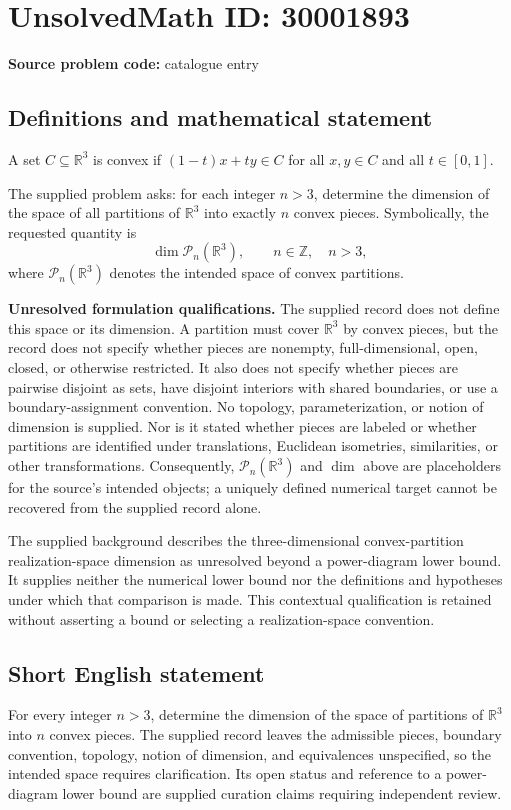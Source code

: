 \documentclass[11pt]{article}
\newcommand{\Z}{\mathbb{Z}}
\newcommand{\R}{\mathbb{R}}
\begin{document}
\section*{UnsolvedMath ID: 30001893}
\textbf{Source problem code:} catalogue entry
\subsection{Definitions and mathematical statement}
A set \(C\subseteq\R^3\) is convex if \((1-t)x+ty\in C\) for all \(x,y\in C\) and all \(t\in[0,1]\).

The supplied problem asks: for each integer \(n>3\), determine the dimension of the space of all partitions of \(\R^3\) into exactly \(n\) convex pieces. Symbolically, the requested quantity is
\[
\dim\mathcal P_n(\R^3),\qquad n\in\Z,\quad n>3,
\]
where \(\mathcal P_n(\R^3)\) denotes the intended space of convex partitions.

\textbf{Unresolved formulation qualifications.} The supplied record does not define this space or its dimension. A partition must cover \(\R^3\) by convex pieces, but the record does not specify whether pieces are nonempty, full-dimensional, open, closed, or otherwise restricted. It also does not specify whether pieces are pairwise disjoint as sets, have disjoint interiors with shared boundaries, or use a boundary-assignment convention. No topology, parameterization, or notion of dimension is supplied. Nor is it stated whether pieces are labeled or whether partitions are identified under translations, Euclidean isometries, similarities, or other transformations. Consequently, \(\mathcal P_n(\R^3)\) and \(\dim\) above are placeholders for the source's intended objects; a uniquely defined numerical target cannot be recovered from the supplied record alone.

The supplied background describes the three-dimensional convex-partition realization-space dimension as unresolved beyond a power-diagram lower bound. It supplies neither the numerical lower bound nor the definitions and hypotheses under which that comparison is made. This contextual qualification is retained without asserting a bound or selecting a realization-space convention.
\subsection{Short English statement}
For every integer \(n>3\), determine the dimension of the space of partitions of \(\R^3\) into \(n\) convex pieces. The supplied record leaves the admissible pieces, boundary convention, topology, notion of dimension, and equivalences unspecified, so the intended space requires clarification. Its open status and reference to a power-diagram lower bound are supplied curation claims requiring independent review.
\end{document}
